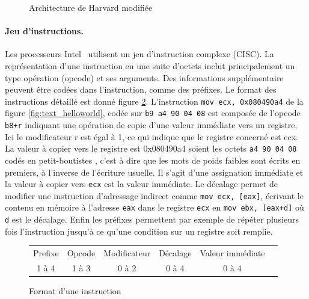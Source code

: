 \begin{figure}
\begin{center}

\caption{Architecture de Harvard modifiée}
\label{fig:arch_harvard_mod}
\end{center}
\end{figure}

\paragraph{Jeu d'instructions.}
Les processeurs Intel \xq\ utilisent un jeu d'instruction complexe (CISC). La représentation d'une instruction en une suite d'octets inclut principalement un type opération (opcode) et ses arguments. Des informations supplémentaire peuvent être codées dans l'instruction, comme des préfixes. Le format des instructions détaillé est donné figure \ref{fig:format_insts_x86}.
L'instruction \texttt{mov ecx, 0x080490a4} de la figure \ref{fig:text_helloworld}, codée sur \texttt{b9 a4 90 04 08} est composée de l'opcode \texttt{b8+r} indiquant une opération de copie d'une valeur immédiate vers un registre. Ici le modificateur r est égal à 1, ce qui indique que le registre concerné est ecx. La valeur à copier vers le registre est 0x080490a4 soient les octets \texttt{a4 90 04 08} codés en petit-boutistes , c'est à dire que les mots de poids faibles sont écrits en premiers, à l'inverse de l'écriture usuelle.
Il s'agit d'une assignation immédiate et la valeur à copier vers \texttt{ecx} est la valeur immédiate.
Le décalage permet de modifier une instruction d'adressage indirect comme \texttt{mov ecx, [eax]}, écrivant le contenu en mémoire à l'adresse \texttt{eax} dans le registre \texttt{ecx} en \texttt{mov ebx, [eax+d]} où \texttt{d} est le décalage.
Enfin les préfixes permettent par exemple de répéter plusieurs fois l'instruction jusqu'à ce qu'une condition sur un registre soit remplie.

\begin{figure}
\begin{center} 
\begin{tabular}{|c|c|c|c|c|c|}
\hline
Prefixe & Opcode & Modificateur & Décalage & Valeur immédiate\\
1 à 4 & 1 à 3 & 0 à 2 & 0 à 4 & 0 à 4\\
\hline
\end{tabular}
\end{center} 
\caption{Format d'une instruction \xq}
\label{fig:format_insts_x86}
\end{figure}

